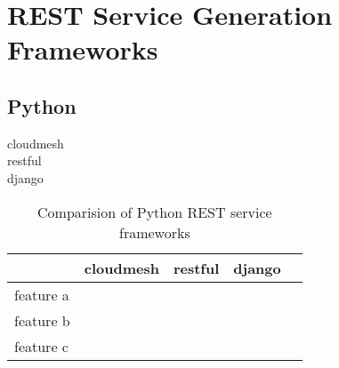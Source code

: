 \section{REST Service Generation Frameworks}

\subsection{Python}

\begin{description}

\item[cloudmesh]

\item[restful]

\item[django]

\end{description}

\begin{table}[htb]

\caption{Comparision of Python REST service frameworks}

\begin{tabular}{|l|l|l|l|l|}
\hline

 & cloudmesh &  restful &  django &  \\ \hline
 feature a &  &  &  &  \\ \hline
 feature b &  &  &  &  \\ \hline
 feature c &  &  &  &  \\ \hline
\end{tabular}

\end{table}

